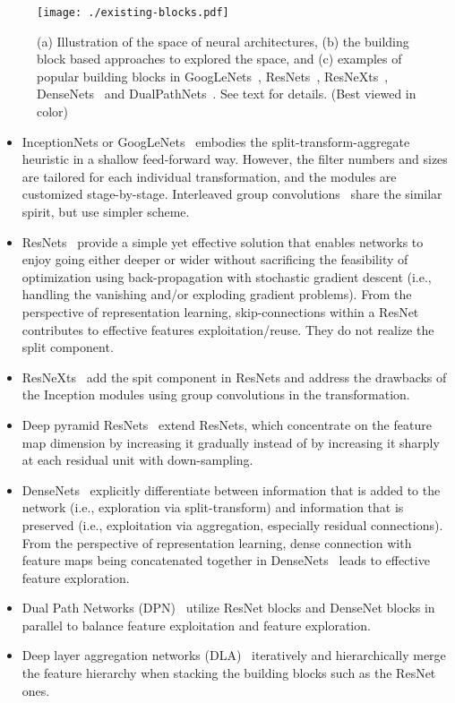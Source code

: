 \documentclass[10pt,twocolumn,letterpaper]{article}
\begin{document}
\begin{figure}
    	\centering
    	\texttt{[image: ./existing-blocks.pdf]}
    	\caption{\small{ (a) Illustration of the space of neural architectures, (b) the building block based approaches to explored the space, and (c) examples of popular building blocks in GoogLeNets~\cite{InceptionNet}, ResNets~\cite{ResidualNet}, ResNeXts~\cite{ResNeXt}, DenseNets~\cite{DenseNet} and DualPathNets~\cite{DPN}.
    	See text for details. (Best viewed in color)} 
    	}
    	\label{fig:existing-blocks} 
\end{figure}
\begin{itemize}[leftmargin=*]
\itemsep0em
    \item InceptionNets or GoogLeNets~\cite{InceptionNet} embodies the split-transform-aggregate heuristic in a shallow feed-forward way. However, the filter numbers and sizes are tailored for each individual transformation, and the modules are customized stage-by-stage. Interleaved group convolutions~\cite{IGC1} share the similar spirit, but use simpler scheme. 
    \item ResNets~\cite{ResidualNet} provide a simple yet effective solution that enables networks to enjoy going either deeper or wider without sacrificing the feasibility of optimization using back-propagation with stochastic gradient descent (i.e., handling the vanishing and/or exploding gradient problems). From the perspective of representation learning, skip-connections within a ResNet~\cite{ResidualNet} contributes to effective features exploitation/reuse. They do not realize the split component.
    \item ResNeXts~\cite{ResNeXt} add the spit component in ResNets and address the drawbacks of the Inception modules using group convolutions in the transformation.
    \item Deep pyramid ResNets~\cite{DPRN} extend ResNets, which concentrate on the feature map dimension by increasing it gradually instead of by increasing it sharply at each residual unit with down-sampling.  
    \item DenseNets~\cite{DenseNet} explicitly differentiate between information that is added to the network (i.e., exploration via split-transform) and information that is preserved (i.e., exploitation via aggregation, especially residual connections). From the perspective of representation learning, dense connection with feature maps being concatenated together in DenseNets~\cite{DenseNet} leads to effective feature exploration. 
    \item Dual Path Networks (DPN)~\cite{DPN} utilize ResNet blocks and DenseNet blocks in parallel to balance feature exploitation and feature exploration. 
    \item Deep layer aggregation networks (DLA)~\cite{DLA} iteratively and hierarchically merge the feature hierarchy when stacking the building blocks such as the ResNet ones.  
\end{itemize}
\end{document}
